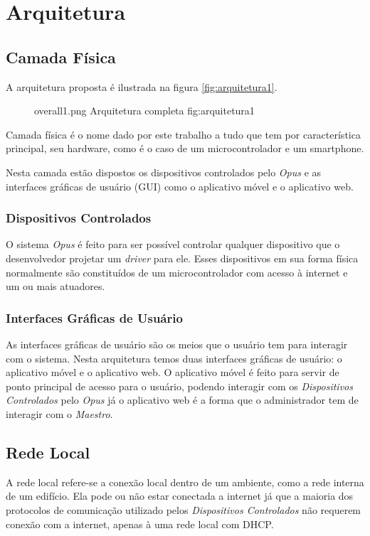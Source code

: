 \chapter{Arquitetura}
\section{Camada Física}

A arquitetura proposta é ilustrada na figura \ref{fig:arquitetura1}.
\begin{figure}[h!]
    {overall1.png}
    {Arquitetura completa}
    {fig:arquitetura1}
\end{figure}

\label{arq-subsec:camada-fisica}
Camada física é o nome dado por este trabalho a tudo que tem por característica
principal, seu hardware, como é o caso de um microcontrolador e um smartphone.

Nesta camada estão dispostos os dispositivos controlados pelo \emph{Opus} e as interfaces
gráficas de usuário (GUI) como o aplicativo móvel e o aplicativo web.

\subsection{Dispositivos Controlados}
\label{arq-subsubsec:dispositivos-controlados}
O sistema \emph{Opus} é feito para ser possível controlar qualquer dispositivo que o desenvolvedor
projetar um \emph{driver} para ele. Esses dispositivos em sua forma física normalmente
são constituídos de um microcontrolador com acesso à internet e um ou mais atuadores.

\subsection{Interfaces Gráficas de Usuário}
\label{arq-subsubsec:interfaces-graficas-usuario}
As interfaces gráficas de usuário são os meios que o usuário tem para interagir com o sistema.
Nesta arquitetura temos duas interfaces gráficas de usuário: o aplicativo móvel e o aplicativo web.
O aplicativo móvel é feito para servir de ponto principal de acesso para o usuário, podendo interagir com
os \emph{Dispositivos Controlados} pelo \emph{Opus} já o aplicativo web é a forma que o administrador
tem de interagir com o \emph{Maestro}.


\section{Rede Local}
\label{arq-subsec:rede-local}
A rede local refere-se a conexão local dentro de um ambiente, como a rede interna de um edifício. Ela pode ou não
estar conectada a internet já que a maioria dos protocolos de comunicação utilizado pelos
\emph{Dispositivos Controlados} não requerem conexão com a internet, apenas à uma rede local com DHCP.

